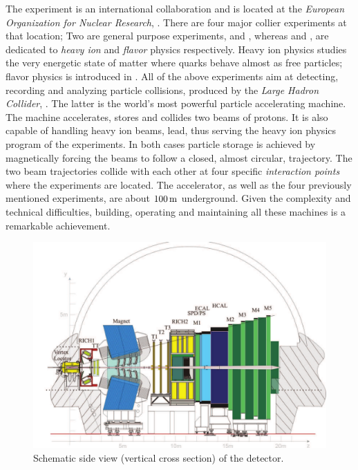 
The \lhcb experiment is an international collaboration and is located at the {\it European Organization for Nuclear Research}, \cern.
There are four major collier experiments at that location; Two are general purpose experiments, \atlas and \cms, whereas
\alice and \lhcb, are dedicated to {\it heavy ion} and {\it flavor} physics respectively. Heavy ion physics
studies the very energetic state of matter where quarks behave almost as free particles;
flavor physics is introduced in . All of the above experiments aim at detecting,
recording and analyzing particle collisions, produced by the {\it Large Hadron Collider}, \lhc.
The latter is the world's most powerful particle accelerating machine.
The \lhc machine accelerates, stores and collides two beams of protons. It is also capable of handling
heavy ion beams, \eg lead, thus serving the heavy ion physics program of the experiments.
In both cases particle storage is achieved by magnetically forcing the beams to follow a closed, almost circular,
trajectory. The two beam trajectories collide with each other at four specific {\it interaction points}
where the experiments are located. The \lhc accelerator, as well as the four previously
mentioned experiments, are about $100\rm \,m$ underground. Given the complexity and technical difficulties,
building, operating and maintaining all these machines is a remarkable achievement.

\begin{figure}[t]
  \centering
  \includegraphics[width=1\textwidth]{Figures/Chapter2/detector_cross_cmyk}
  \caption{Schematic side view (vertical cross section) of the \lhcb detector.}
  \label{lhcb_detector_cross_section}
\end{figure}


